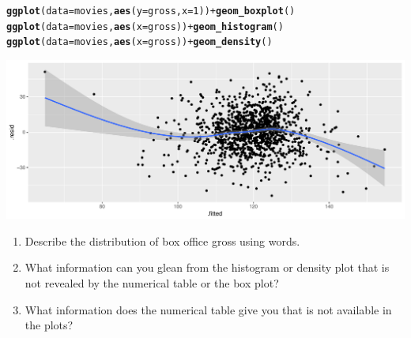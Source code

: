 \documentclass[10pt]{article}\usepackage[]{graphicx}\usepackage[]{color}
\makeatletter
\def\maxwidth{ %
  \ifdim\Gin@nat@width>\linewidth
    \linewidth
  \else
    \Gin@nat@width
  \fi
}
\newcommand{\hlnum}[1]{\textcolor[rgb]{0.686,0.059,0.569}{#1}}%
\newcommand{\hlopt}[1]{\textcolor[rgb]{0,0,0}{#1}}%
\newcommand{\hlstd}[1]{\textcolor[rgb]{0.345,0.345,0.345}{#1}}%
\newcommand{\hlkwc}[1]{\textcolor[rgb]{0.333,0.667,0.333}{#1}}%
\newcommand{\hlkwd}[1]{\textcolor[rgb]{0.737,0.353,0.396}{\textbf{#1}}}%
\newenvironment{kframe}{%
 \def\at@end@of@kframe{}%
 \ifinner\ifhmode%
  \def\at@end@of@kframe{\end{minipage}}%
  \begin{minipage}{\columnwidth}%
 \fi\fi%
 \def\FrameCommand##1{\hskip\@totalleftmargin \hskip-\fboxsep
 \colorbox{shadecolor}{##1}\hskip-\fboxsep
     \hskip-\linewidth \hskip-\@totalleftmargin \hskip\columnwidth}%
 \MakeFramed {\advance\hsize-\width
   \@totalleftmargin\z@ \linewidth\hsize
   \@setminipage}}%
 {\par\unskip\endMakeFramed%
 \at@end@of@kframe}
\newenvironment{knitrout}{}{} %
\newcommand{\shortans}{\vspace{1in}}
\newcommand{\ans}{\vspace{0.25in}}
\makeatother
\begin{document}
\begin{knitrout}
\color{fgcolor}\begin{kframe}
\begin{alltt}
\hlkwd{ggplot}\hlstd{(}\hlkwc{data}\hlstd{=movies,} \hlkwd{aes}\hlstd{(}\hlkwc{y}\hlstd{=gross,} \hlkwc{x}\hlstd{=}\hlnum{1}\hlstd{))} \hlopt{+} \hlkwd{geom_boxplot}\hlstd{()}
\hlkwd{ggplot}\hlstd{(}\hlkwc{data}\hlstd{=movies,} \hlkwd{aes}\hlstd{(}\hlkwc{x}\hlstd{=gross))} \hlopt{+} \hlkwd{geom_histogram}\hlstd{()}
\hlkwd{ggplot}\hlstd{(}\hlkwc{data}\hlstd{=movies,} \hlkwd{aes}\hlstd{(}\hlkwc{x}\hlstd{=gross))} \hlopt{+} \hlkwd{geom_density}\hlstd{()}
\end{alltt}
\end{kframe}
\end{knitrout}
\begin{knitrout}
\color{fgcolor}
\includegraphics[width=\maxwidth]{figure/unnamed-chunk-5-1} 

\end{knitrout}

\begin{enumerate}
  \item Describe the distribution of box office gross using words. 
  \ans
  \item What information can you glean from the histogram or density plot that is not revealed by the numerical table or the box plot?
  \ans
  \item What information does the numerical table give you that is not available in the plots?
  \ans
  \ans
\end{enumerate}

% 
\end{document}
